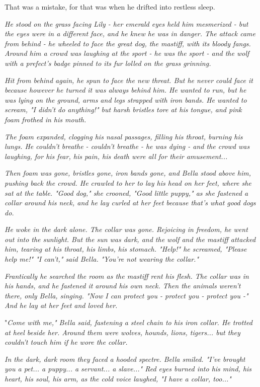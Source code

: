 That was a mistake, for that was when he drifted into restless sleep.

\sbreak

\emph{He stood on the grass facing Lily - her emerald eyes held him mesmerized - but the eyes were in a different face, and he knew he was in danger. The attack came from behind - he wheeled to face the great dog, the mastiff, with its bloody fangs. Around him a crowd was laughing at the sport - he was the sport - and the wolf with a prefect's badge pinned to its fur lolled on the grass grinning.}

\emph{Hit from behind again, he spun to face the new threat. But he never could face it because however he turned it was always behind him. He wanted to run, but he was lying on the ground, arms and legs strapped with iron bands. He wanted to scream, "I didn't do anything!" but harsh bristles tore at his tongue, and pink foam frothed in his mouth.}

\emph{The foam expanded, clogging his nasal passages, filling his throat, burning his lungs. He couldn't breathe - couldn't breathe - he was dying - and the crowd was laughing, for his fear, his pain, his death were all for their amusement...}

\emph{Then foam was gone, bristles gone, iron bands gone, and Bella stood above him, pushing back the crowd. He crawled to her to lay his head on her feet, where she sat at the table. "Good dog," she crooned, "Good little puppy," as she fastened a collar around his neck, and he lay curled at her feet because that's what good dogs do.}

\emph{He woke in the dark alone. The collar was gone. Rejoicing in freedom, he went out into the sunlight. But the sun was dark, and the wolf and the mastiff attacked him, tearing at his throat, his limbs, his stomach. "Help!" he screamed, "Please help me!" "I can't," said Bella. "You're not wearing the collar."}

\emph{Frantically he searched the room as the mastiff rent his flesh. The collar was in his hands, and he fastened it around his own neck. Then the animals weren't there, only Bella, singing. "Now I can protect you - protect you - protect you -" And he lay at her feet and loved her.}

"\emph{Come with me," Bella said, fastening a steel chain to his iron collar. He trotted at heel beside her. Around them were wolves, hounds, lions, tigers... but they couldn't touch him if he wore the collar.}

\emph{In the dark, dark room they faced a hooded spectre. Bella smiled. "I've brought you a pet... a puppy... a servant... a slave..." Red eyes burned into his mind, his heart, his soul, his arm, as the cold voice laughed, "I have a collar, too..."}

